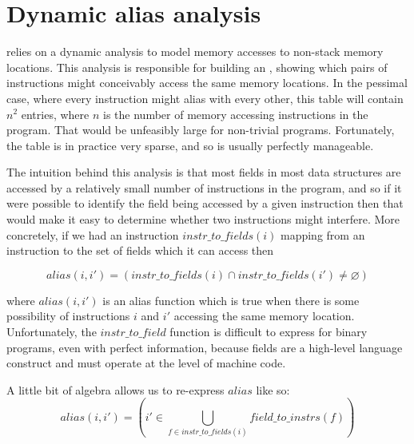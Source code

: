 \section{Dynamic alias analysis}
\label{sect:program_model:dynamic_alias}


{\Technique} relies on a dynamic analysis to model memory accesses to
non-stack memory locations.  This analysis is responsible for building
an , showing which pairs of instructions
might conceivably access the same memory locations.  In the pessimal
case, where every instruction might alias with every other, this table
will contain $n^2$ entries, where $n$ is the number of memory
accessing instructions in the program.  That would be unfeasibly large
for non-trivial programs.  Fortunately, the table is in practice very
sparse, and so is usually perfectly manageable.


The intuition behind this analysis is that most fields in most data
structures are accessed by a relatively small number of instructions
in the program, and so if it were possible to identify the field being
accessed by a given instruction then that would make it easy to
determine whether two instructions might interfere.  More concretely,
if we had an instruction $\mathit{instr\_to\_fields}(i)$ mapping from
an instruction to the set of fields which it can access then

\begin{displaymath}
\mathit{alias}(i, i') = (\mathit{instr\_to\_fields}(i) \cap \mathit{instr\_to\_fields}(i') \not= \varnothing)
\end{displaymath}

where $\mathit{alias}(i, i')$ is an alias function which is true when
there is some possibility of instructions $i$ and $i'$ accessing the
same memory location.  Unfortunately, the $\mathit{instr\_to\_field}$
function is difficult to express for binary programs, even with
perfect information, because fields are a high-level language
construct and {\technique} must operate at the level of machine code.

A little bit of algebra allows us to re-express $\mathit{alias}$ like
so:
\begin{displaymath}
\mathit{alias}(i, i') = \left(i' \in \bigcup_{f \in \mathit{instr\_to\_fields}(i)} \mathit{field\_to\_instrs}(f)\right)
\end{displaymath}

